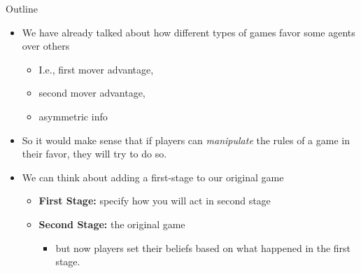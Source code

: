 \documentclass{beamer}
\title{}
\author{Dante Yasui }
\institute{EC327 Game Theory}
\date{Winter 2024}
\theoremstyle{plain}
\begin{document}
\begin{frame}[plain]
    \titlepage
\end{frame}
\addtocounter{framenumber}{-1}

\begin{frame}[plain]{Outline}
  \tableofcontents
\end{frame}
\addtocounter{framenumber}{-1}


\begin{frame}{}
  \begin{itemize}
    \item We have already talked about how different types of games 
    favor some agents over others 
    \begin{itemize}
      \item I.e., first mover advantage, 
      \item second mover advantage, 
      \item asymmetric info 
    \end{itemize}
    \item So it would make sense that if players can \textit{manipulate}
    the rules of a game in their favor, they will try to do so.
  \end{itemize}  
\end{frame}


\begin{frame}{}
  \begin{itemize}
    \item We can think about adding a first-stage to our original game 
    \begin{itemize}
      \item \textbf{First Stage:} specify how you will act in second stage 
      \item \textbf{Second Stage:} the original game
      \begin{itemize}
        \item but now players set their beliefs based on what happened
        in the first stage.
      \end{itemize}
    \end{itemize}
  \end{itemize}  
\end{frame}

\end{document}
